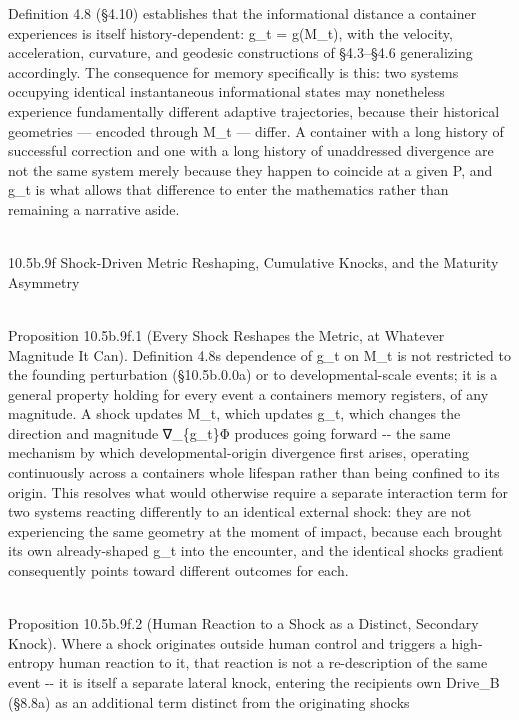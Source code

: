 \documentclass[
]{article}
\begin{document}
Definition 4.8 (§4.10) establishes that the informational distance a
container experiences is itself history-dependent: g\_t = g(M\_t), with
the velocity, acceleration, curvature, and geodesic constructions of
§4.3--§4.6 generalizing accordingly. The consequence for memory
specifically is this: two systems occupying identical instantaneous
informational states may nonetheless experience fundamentally different
adaptive trajectories, because their historical geometries --- encoded
through M\_t --- differ. A container with a long history of successful
correction and one with a long history of unaddressed divergence are not
the same system merely because they happen to coincide at a given P, and
g\_t is what allows that difference to enter the mathematics rather than
remaining a narrative aside.\\
\strut \\
10.5b.9f Shock-Driven Metric Reshaping, Cumulative Knocks, and the
Maturity Asymmetry\\
\strut \\
Proposition 10.5b.9f.1 (Every Shock Reshapes the Metric, at Whatever
Magnitude It Can). Definition 4.8\textquotesingle s dependence of g\_t
on M\_t is not restricted to the founding perturbation (§10.5b.0.0a) or
to developmental-scale events; it is a general property holding for
every event a container\textquotesingle s memory registers, of any
magnitude. A shock updates M\_t, which updates g\_t, which changes the
direction and magnitude ∇\_\{g\_t\}Φ produces going forward -\/- the
same mechanism by which developmental-origin divergence first arises,
operating continuously across a container\textquotesingle s whole
lifespan rather than being confined to its origin. This resolves what
would otherwise require a separate interaction term for two systems
reacting differently to an identical external shock: they are not
experiencing the same geometry at the moment of impact, because each
brought its own already-shaped g\_t into the encounter, and the
identical shock\textquotesingle s gradient consequently points toward
different outcomes for each.\\
\strut \\
Proposition 10.5b.9f.2 (Human Reaction to a Shock as a Distinct,
Secondary Knock). Where a shock originates outside human control and
triggers a high-entropy human reaction to it, that reaction is not a
re-description of the same event -\/- it is itself a separate lateral
knock, entering the recipient\textquotesingle s own Drive\_B (§8.8a) as
an additional term distinct from the originating shock\textquotesingle s
\end{document}
